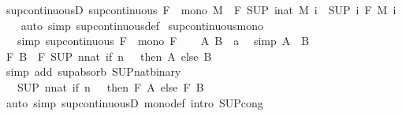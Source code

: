 \begin{isabellebody}
\isanewline
{}\isamarkupfalse%
\ sup{\isacharunderscore}continuousD{\isacharcolon}\ {\isachardoublequoteopen}sup{\isacharunderscore}continuous\ F\ {\isasymLongrightarrow}\ mono\ M\ {\isasymLongrightarrow}\ F\ {\isacharparenleft}SUP\ i{\isacharcolon}{\isacharcolon}nat{\isachardot}\ M\ i{\isacharparenright}\ {\isacharequal}\ {\isacharparenleft}SUP\ i{\isachardot}\ F\ {\isacharparenleft}M\ i{\isacharparenright}{\isacharparenright}{\isachardoublequoteclose}\isanewline
%
\isadelimproof
\ \ %
\endisadelimproof
%
\isatagproof
{}\isamarkupfalse%
\ {\isacharparenleft}auto\ simp{\isacharcolon}\ sup{\isacharunderscore}continuous{\isacharunderscore}def{\isacharparenright}%
\endisatagproof
{\isafoldproof}%
%
\isadelimproof
\isanewline
%
\endisadelimproof
\isanewline
{}\isamarkupfalse%
\ sup{\isacharunderscore}continuous{\isacharunderscore}mono{\isacharcolon}\isanewline
\ \ \ {\isacharbrackleft}simp{\isacharbrackright}{\isacharcolon}\ {\isachardoublequoteopen}sup{\isacharunderscore}continuous\ F{\isachardoublequoteclose}\ \ {\isachardoublequoteopen}mono\ F{\isachardoublequoteclose}\isanewline
%
\isadelimproof
%
\endisadelimproof
%
\isatagproof
{}\isamarkupfalse%
\isanewline
\ \ \isamarkupfalse%
\ A\ B\ {\isacharcolon}{\isacharcolon}\ {\isachardoublequoteopen}{\isacharprime}a{\isachardoublequoteclose}\ \isamarkupfalse%
\ {\isacharbrackleft}simp{\isacharbrackright}{\isacharcolon}\ {\isachardoublequoteopen}A\ {\isasymle}\ B{\isachardoublequoteclose}\isanewline
\ \ \isamarkupfalse%
\ {\isachardoublequoteopen}F\ B\ {\isacharequal}\ F\ {\isacharparenleft}SUP\ n{\isacharcolon}{\isacharcolon}nat{\isachardot}\ if\ n\ {\isacharequal}\ {}\ then\ A\ else\ B{\isacharparenright}{\isachardoublequoteclose}\isanewline
\ \ \ \ \isamarkupfalse%
\ {\isacharparenleft}simp\ add{\isacharcolon}\ sup{\isacharunderscore}absorb{}\ SUP{\isacharunderscore}nat{\isacharunderscore}binary{\isacharparenright}\isanewline
\ \ \isamarkupfalse%
\ \isamarkupfalse%
\ {\isachardoublequoteopen}{\isasymdots}\ {\isacharequal}\ {\isacharparenleft}SUP\ n{\isacharcolon}{\isacharcolon}nat{\isachardot}\ if\ n\ {\isacharequal}\ {}\ then\ F\ A\ else\ F\ B{\isacharparenright}{\isachardoublequoteclose}\isanewline
\ \ \ \ \isamarkupfalse%
\ {\isacharparenleft}auto\ simp{\isacharcolon}\ sup{\isacharunderscore}continuousD\ mono{\isacharunderscore}def\ intro{\isacharbang}{\isacharcolon}\ SUP{\isacharunderscore}cong{\isacharparenright}\isanewline

\end{isabellebody}

